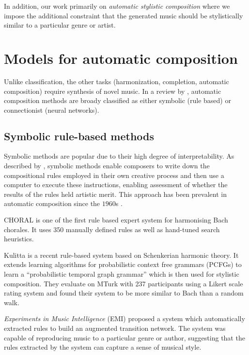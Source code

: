 In addition, our work primarily on \emph{automatic stylistic composition} where
we impose the additional constraint that the generated music should be
stylistically similar to a particular genre or artist.


\section{Models for automatic composition}

Unlike classification, the other tasks (harmonization, completion, automatic
composition) require synthesis of novel music. In a review by
\citet{toiviainen2000symbolic}, automatic composition methods are broady
classified as either symbolic (\ie rule based) or connectionist (\ie neural
networks).

\subsection{Symbolic rule-based methods}

Symbolic methods are popular due to their high degree of interpretability. As
described by \citet{todd1989connectionist}, symbolic methods enable composers
to write down the compositional rules employed in their own creative process
and then use a computer to execute these instructions, enabling assessment of
whether the results of the rules held artistic merit. This approach has been
prevalent in automatic composition since the $1960$s
\citep{todd1989connectionist}.

CHORAL \citep{ebciouglu1988expert} is one of the first rule based expert system
for harmonising Bach chorales. It uses 350 manually defined rules as well as
hand-tuned search heuristics.

Kulitta \citep{quick2014kulitta} is a recent rule-based system based on
Schenkerian harmonic theory\cite{schenker1954harmony}. It extends learning
algorithms for probabilistic context free grammars (PCFGs) to learn a
``probabilistic temporal graph grammar'' \citep{quick2013temporal} which is
then used for stylistic composition. They evaluate on MTurk with 237
participants using a Likert scale rating system \citep{likert1932technique}
and found their system to be more similar to Bach than a random walk.

\emph{Experiments in Music Intelligence} (EMI)
\citep{cope1987experiments,cope1992computer} proposed a system which
automatically extracted rules to build an augmented transition
network\citep{wanner1980atn}. The system was capable of reproducing music
to a particular genre or author, suggesting that the rules extracted by the
system can capture a sense of musical style.

